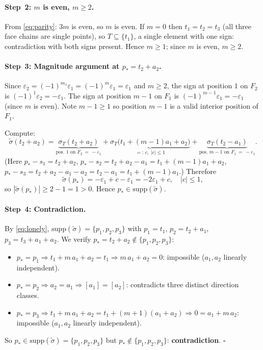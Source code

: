 \paragraph{Step~2: $m$ is even, $m\ge 2$.}
From \eqref{eq:parity}: $3m$ is even, so $m$ is even.
If $m=0$ then $t_1=t_2=t_3$ (all three face chains are single points),
so $T\subseteq\{t_1\}$, a single element with one sign:
contradiction with both signs present.  Hence $m\ge 1$; since $m$ is even,
$m\ge 2$.

\paragraph{Step~3: Magnitude argument at $p_*=t_2+a_2$.}
Since $\varepsilon_2=(-1)^{m_1}\varepsilon_1=(-1)^m\varepsilon_1=\varepsilon_1$
and $m\ge 2$, the sign at position $1$ on $F_2$ is
$(-1)^1\varepsilon_2=-\varepsilon_1$.
The sign at position $m-1$ on $F_1$ is
$(-1)^{m-1}\varepsilon_1=-\varepsilon_1$ (since $m$ is even).
Note $m-1\ge 1$ so position $m-1$ is a valid interior position of $F_1$.

Compute:
\[
  \tilde\sigma(t_2+a_2)
  = \underbrace{\sigma_T(t_2+a_2)}_{\text{pos.\ 1 on }F_2\,=\,-\varepsilon_1}
  + \underbrace{\sigma_T\!\bigl(t_1+(m-1)a_1+a_2\bigr)}_{=:\,c,\;|c|\le 1}
  + \underbrace{\sigma_T(t_2-a_1)}_{\text{pos.\ }m-1\text{ on }F_1\,=\,-\varepsilon_1}.
\]
(Here $p_*-s_1=t_2+a_2$, $p_*-s_2=t_2+a_2-a_1=t_1+(m-1)a_1+a_2$,
$p_*-s_3=t_2+a_2-a_1-a_2=t_2-a_1=t_1+(m-1)a_1$.)
Therefore
\[
  \tilde\sigma(p_*) = -\varepsilon_1 + c - \varepsilon_1 = -2\varepsilon_1+c,
  \quad |c|\le 1,
\]
so $|\tilde\sigma(p_*)|\ge 2-1=1>0$.  Hence $p_*\in\mathrm{supp}(\tilde\sigma)$.

\paragraph{Step~4: Contradiction.}
By \eqref{eq:lonely}, $\mathrm{supp}(\tilde\sigma)=\{p_1,p_2,p_3\}$ with
$p_1=t_1$, $p_2=t_2+a_1$, $p_3=t_3+a_1+a_2$.
We verify $p_*=t_2+a_2\notin\{p_1,p_2,p_3\}$:
\begin{itemize}
\item $p_*=p_1\Rightarrow t_1+m\,a_1+a_2=t_1\Rightarrow m\,a_1+a_2=0$:
      impossible ($a_1,a_2$ linearly independent).
\item $p_*=p_2\Rightarrow a_2=a_1\Rightarrow [a_1]=[a_2]$:
      contradicts three distinct direction classes.
\item $p_*=p_3\Rightarrow t_1+m\,a_1+a_2=t_1+(m+1)(a_1+a_2)
      \Rightarrow 0=a_1+m\,a_2$:
      impossible ($a_1,a_2$ linearly independent).
\end{itemize}
So $p_*\in\mathrm{supp}(\tilde\sigma)=\{p_1,p_2,p_3\}$ but $p_*\notin\{p_1,p_2,p_3\}$:
\textbf{contradiction}. \hfill$\square$

